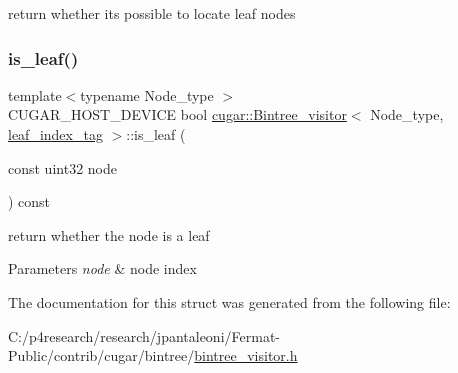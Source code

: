 return whether it\textquotesingle{}s possible to locate leaf nodes \mbox{\label{structcugar_1_1_bintree__visitor_3_01_node__type_00_01leaf__index__tag_01_4_adf77e037fc2d9e0d31979479ddb2dced}} 
\subsubsection{\texorpdfstring{is\+\_\+leaf()}{is\_leaf()}}
{\footnotesize\ttfamily template$<$typename Node\+\_\+type $>$ \\
C\+U\+G\+A\+R\+\_\+\+H\+O\+S\+T\+\_\+\+D\+E\+V\+I\+CE bool \hyperlink{structcugar_1_1_bintree__visitor}{cugar\+::\+Bintree\+\_\+visitor}$<$ Node\+\_\+type, \hyperlink{structcugar_1_1leaf__index__tag}{leaf\+\_\+index\+\_\+tag} $>$\+::is\+\_\+leaf (\begin{DoxyParamCaption}\item[{const uint32}]{node }\end{DoxyParamCaption}) const\hspace{0.3cm}{\ttfamily [inline]}}

return whether the node is a leaf


\begin{DoxyParams}{Parameters}
{\em node} & node index \\
\hline
\end{DoxyParams}


The documentation for this struct was generated from the following file\+:\begin{DoxyCompactItemize}
\item 
C\+:/p4research/research/jpantaleoni/\+Fermat-\/\+Public/contrib/cugar/bintree/\hyperlink{bintree__visitor_8h}{bintree\+\_\+visitor.\+h}\end{DoxyCompactItemize}
